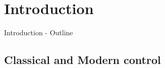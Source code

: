 \documentclass[../main/main.tex]{subfiles}
\begin{document}
\onlyinsubfile{%
}

\section{Introduction}%
\label{sec:introduction}

\begin{frame}{Introduction - Outline}
\end{frame}

\subsection{Classical and Modern control}
\end{document}
